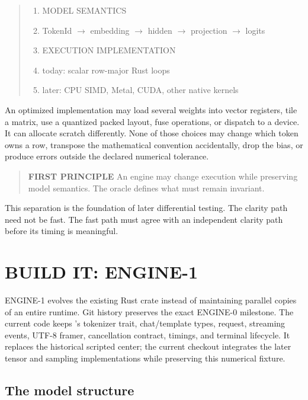 \begin{quote}
\begin{enumerate}
\item MODEL SEMANTICS
\item TokenId  \(\longrightarrow\)  embedding  \(\longrightarrow\)  hidden  \(\longrightarrow\)  projection  \(\longrightarrow\)  logits
\item EXECUTION IMPLEMENTATION
\item today: scalar row-major Rust loops
\item later: CPU SIMD, Metal, CUDA, other native kernels
\end{enumerate}
\end{quote}

An optimized implementation may load several weights into vector
registers, tile a matrix, use a quantized packed layout, fuse
operations, or dispatch to a device. It can allocate scratch
differently. None of those choices may change which token owns a row,
transpose the mathematical convention accidentally, drop the bias, or
produce errors outside the declared numerical tolerance.

\begin{quote}
\textbf{FIRST PRINCIPLE} An engine may change execution while preserving
model semantics. The oracle defines what must remain invariant.
\end{quote}

This separation is the foundation of later differential testing. The
clarity path need not be fast. The fast path must agree with an
independent clarity path before its timing is meaningful.

\section{BUILD IT: ENGINE-1}\label{build-it-engine-1}

ENGINE-1 evolves the existing Rust crate instead of maintaining parallel
copies of an entire runtime. Git history preserves the exact ENGINE-0
milestone. The current code keeps 's tokenizer trait,
chat/template types, request, streaming events, UTF-8 framer,
cancellation contract, timings, and terminal lifecycle. It replaces the
historical scripted center; the current checkout integrates the later tensor
and sampling implementations while preserving this numerical fixture.

\subsection{The model structure}\label{the-model-structure}

